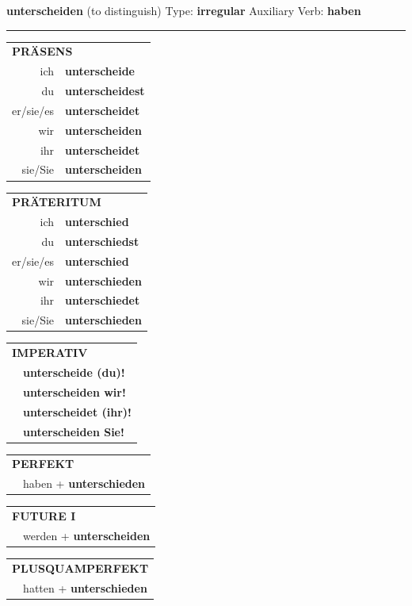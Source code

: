 \documentclass[10pt,a4paper]{revtex4-2}
\begin{document}
\begin{verbbox}
{\Large \bf unterscheiden} (to distinguish) \hfill Type: \textbf{irregular} \hfill Auxiliary Verb: \textbf{haben} 

\vspace{5pt}
\hrule
\vspace{5pt}

\begin{tabular}{rl}
\multicolumn{2}{l}{\textbf{PRÄSENS}}\\
ich & \textbf{unterscheide}\\
du & \textbf{unterscheidest}\\
er/sie/es & \textbf{unterscheidet}\\
wir & \textbf{unterscheiden}\\
ihr & \textbf{unterscheidet}\\
sie/Sie & \textbf{unterscheiden}\\
\end{tabular}
\hfill
\begin{tabular}{rl}
\multicolumn{2}{l}{\textbf{PRÄTERITUM}}\\
ich & \textbf{unterschied}\\
du & \textbf{unterschiedst}\\
er/sie/es & \textbf{unterschied}\\
wir & \textbf{unterschieden}\\
ihr & \textbf{unterschiedet}\\
sie/Sie & \textbf{unterschieden}\\
\end{tabular}
\hfill
\begin{tabular}{rl}
\multicolumn{2}{l}{\textbf{IMPERATIV}}\\
& \textbf{unterscheide (du)!}\\
& \textbf{unterscheiden wir!}\\
& \textbf{unterscheidet (ihr)!}\\
& \textbf{unterscheiden Sie!}\\
\end{tabular}

\vspace{10pt}

\begin{tabular}{rl}
\multicolumn{2}{l}{\textbf{PERFEKT}}\\
& haben + \textbf{unterschieden}\\
\end{tabular}
\hfill
\begin{tabular}{rl}
\multicolumn{2}{l}{\textbf{FUTURE I}}\\
& werden + \textbf{unterscheiden}\\
\end{tabular}
\hfill
\begin{tabular}{rl}
\multicolumn{2}{l}{\textbf{PLUSQUAMPERFEKT}}\\
& hatten + \textbf{unterschieden}\\
\end{tabular}


\end{verbbox}
\end{document}
